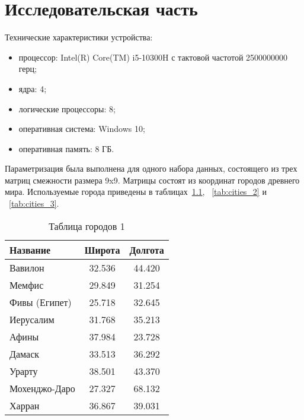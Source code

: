 \chapter{Исследовательская часть}

Технические характеристики устройства:
\begin{itemize}
    \item процессор: Intel(R) Core(TM) i5-10300H с тактовой частотой 2500000000 герц;
	\item ядра:	4;
	\item логические процессоры:	8;
    \item оперативная система: Windows 10;
    \item оперативная память: 8 ГБ.
\end{itemize}

Параметризация была выполнена для одного набора данных, состоящего из трех матриц смежности размера 9x9. Матрицы состоят из координат городов древнего мира. Используемые города приведены в таблицах~\ref{tab:cities_1}, ~\ref{tab:cities_2} и ~\ref{tab:cities_3}.

\begin{table}[H]
\centering
\caption{Таблица городов 1\label{tab:cities_1}}
\begin{tabular}{|l|c|c|}
\hline
\textbf{Название}         & \textbf{Широта} & \textbf{Долгота} \\ \hline
Вавилон                   & 32.536          & 44.420           \\ \hline
Мемфис                    & 29.849          & 31.254           \\ \hline
Фивы (Египет)             & 25.718          & 32.645           \\ \hline
Иерусалим                 & 31.768          & 35.213           \\ \hline
Афины                     & 37.984          & 23.728           \\ \hline
Дамаск                    & 33.513          & 36.292           \\ \hline
Урарту                    & 38.501          & 43.370           \\ \hline
Мохенджо-Даро             & 27.327          & 68.132           \\ \hline
Харран                    & 36.867          & 39.031           \\ \hline
\end{tabular}
\end{table}


